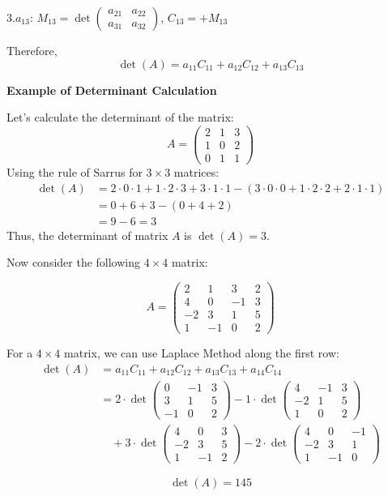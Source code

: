 3.\(a_{13}\):  \(M_{13} = \det \begin{pmatrix} a_{21} & a_{22} \\ a_{31} & a_{32} \end{pmatrix}\),  \(C_{13} = +M_{13}\)

Therefore,
\[
\det(A) = a_{11}C_{11} + a_{12}C_{12} + a_{13}C_{13}
\]


\textbf{Example of Determinant Calculation}

Let's calculate the determinant of the matrix:
\begin{equation*}
A =
\begin{pmatrix}
2 & 1 & 3 \\
1 & 0 & 2 \\
0 & 1 & 1
\end{pmatrix}
\end{equation*}
Using the rule of Sarrus for \(3 \times 3\) matrices:
\begin{align*}
\det(A) &= 2 \cdot 0 \cdot 1 + 1 \cdot 2 \cdot 3 + 3 \cdot 1 \cdot 1 - (3 \cdot 0 \cdot 0 + 1 \cdot 2 \cdot 2 + 2 \cdot 1 \cdot 1) \\
&= 0 + 6 + 3 - (0 + 4 + 2) \\
&= 9 - 6 = 3
\end{align*}
 Thus, the determinant of matrix \(A\) is \(\det(A) = 3\).

 Now consider the following \(4 \times 4\) matrix:

\begin{equation*}
A = 
\begin{pmatrix}
2 & 1 & 3 & 2 \\
4 & 0 & -1 & 3 \\
-2 & 3 & 1 & 5 \\
1 & -1 & 0 & 2
\end{pmatrix}
\end{equation*}

For a \(4 \times 4\) matrix, we can use Laplace Method along the first row:
\begin{align*}
\det(A) &= a_{11}C_{11} + a_{12}C_{12} + a_{13}C_{13} + a_{14}C_{14} \\
&= 2 \cdot \det\begin{pmatrix} 0 & -1 & 3 \\ 3 & 1 & 5 \\ -1 & 0 & 2 \end{pmatrix} 
- 1 \cdot \det\begin{pmatrix} 4 & -1 & 3 \\ -2 & 1 & 5 \\ 1 & 0 & 2 \end{pmatrix} \\
&\quad + 3 \cdot \det\begin{pmatrix} 4 & 0 & 3 \\ -2 & 3 & 5 \\ 1 & -1 & 2 \end{pmatrix} 
- 2 \cdot \det\begin{pmatrix} 4 & 0 & -1 \\ -2 & 3 & 1 \\ 1 & -1 & 0 \end{pmatrix}
\end{align*}

\[\det(A) = 145\]

